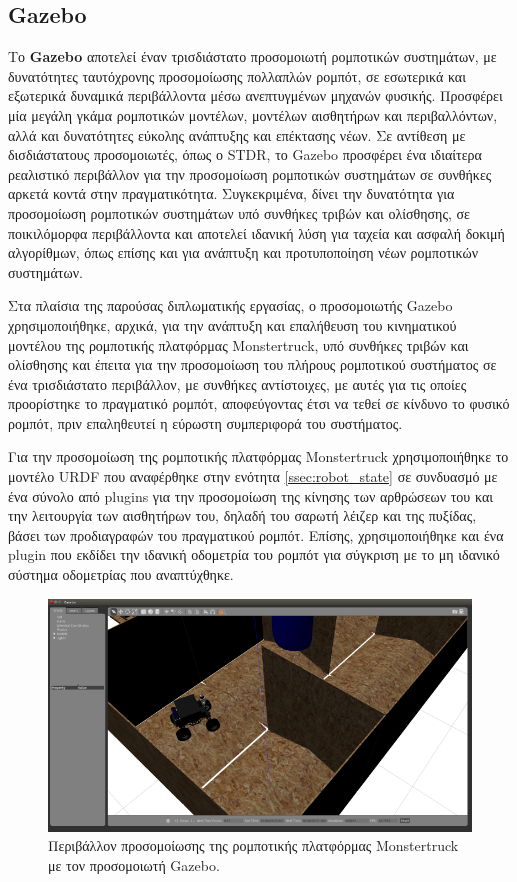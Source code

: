 \subsection{Gazebo}
Το \textbf{Gazebo} αποτελεί έναν τρισδιάστατο προσομοιωτή ρομποτικών συστημάτων, με δυνατότητες ταυτόχρονης προσομοίωσης πολλαπλών ρομπότ, σε εσωτερικά και εξωτερικά δυναμικά περιβάλλοντα μέσω ανεπτυγμένων μηχανών φυσικής. Προσφέρει μία μεγάλη γκάμα ρομποτικών μοντέλων, μοντέλων αισθητήρων και περιβαλλόντων, αλλά και δυνατότητες εύκολης ανάπτυξης και επέκτασης νέων. Σε αντίθεση με δισδιάστατους προσομοιωτές, όπως ο STDR, το Gazebo προσφέρει ένα ιδιαίτερα ρεαλιστικό περιβάλλον για την προσομοίωση ρομποτικών συστημάτων σε συνθήκες αρκετά κοντά στην πραγματικότητα. Συγκεκριμένα, δίνει την δυνατότητα για προσομοίωση ρομποτικών συστημάτων υπό συνθήκες τριβών και ολίσθησης, σε ποικιλόμορφα περιβάλλοντα και αποτελεί ιδανική λύση για ταχεία και ασφαλή δοκιμή αλγορίθμων, όπως επίσης και για ανάπτυξη και προτυποποίηση νέων ρομποτικών συστημάτων.

\bigskip
Στα πλαίσια της παρούσας διπλωματικής εργασίας, ο προσομοιωτής Gazebo χρησιμοποιήθηκε, αρχικά, για την ανάπτυξη και επαλήθευση του κινηματικού μοντέλου της ρομποτικής πλατφόρμας Monstertruck, υπό συνθήκες τριβών και ολίσθησης και έπειτα για την προσομοίωση του πλήρους ρομποτικού συστήματος σε ένα τρισδιάστατο περιβάλλον, με συνθήκες αντίστοιχες, με αυτές για τις οποίες προορίστηκε το πραγματικό ρομπότ, αποφεύγοντας έτσι να τεθεί σε κίνδυνο το φυσικό ρομπότ, πριν επαληθευτεί η εύρωστη συμπεριφορά του συστήματος.

\bigskip
Για την προσομοίωση της ρομποτικής πλατφόρμας Monstertruck χρησιμοποιήθηκε το μοντέλο URDF που αναφέρθηκε στην ενότητα \ref{ssec:robot_state} σε συνδυασμό με ένα σύνολο από plugins για την προσομοίωση της κίνησης των αρθρώσεων του και την λειτουργία των αισθητήρων του, δηλαδή του σαρωτή λέιζερ και της πυξίδας, βάσει των προδιαγραφών του πραγματικού ρομπότ. Επίσης, χρησιμοποιήθηκε και ένα plugin που εκδίδει την ιδανική οδομετρία του ρομπότ για σύγκριση με το μη ιδανικό σύστημα οδομετρίας που αναπτύχθηκε.

\begin{figure}[!ht]
	\centering
	\includegraphics[width=\linewidth]{Chapters/Chapter4/Figures/gazebo_simulator.png}
	\caption{Περιβάλλον προσομοίωσης της ρομποτικής πλατφόρμας Monstertruck με τον προσομοιωτή Gazebo.}
	\label{fig:gazebo_simulator}
\end{figure}


